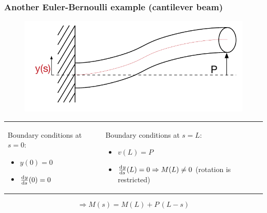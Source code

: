 \begin{frame}
  \frametitle{Another Euler-Bernoulli example (cantilever beam)}
  
  \begin{figure}
    \centering
    \includegraphics[width=16cm, keepaspectratio=true]{sections/traditional_beams/images/EulerCanitleverExample2}
  \end{figure}
  
  \begin{tabularx}{\linewidth}{XX}
    {
      Boundary conditions at $s=0$:
      \begin{itemize}
        \item $y(0) = 0$
        \item $\od{y}{s}(0) = 0$
      \end{itemize}
    } & {
      Boundary conditions at $s=L$:
      \begin{itemize}
        \item $v(L) = P$
        \item $\od{y}{s}(L) = 0 \Rightarrow M(L) \neq 0$ \newline
          \null \quad (rotation is restricted)
      \end{itemize}
    }
  \end{tabularx}
  
  \begin{displaymath}
    \Rightarrow M(s) = M(L) + P \, (L-s)
  \end{displaymath}

\end{frame}


